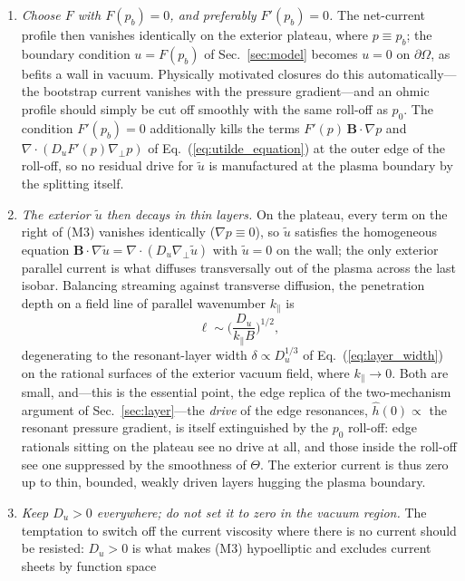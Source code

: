 \documentclass[english]{article}
\newcommand{\bB}{\mathbf{B}}
\newcommand{\gradperp}{\nabla_{\!\perp}}
\begin{document}
\begin{enumerate}
\item \emph{Choose $F$ with $F(p_b)=0$, and preferably $F'(p_b)=0$.} The net-current profile then
vanishes identically on the exterior plateau, where $p\equiv p_b$; the boundary condition
$u=F(p_b)$ of Sec.~\ref{sec:model} becomes $u=0$ on $\partial\Omega$, as befits a wall in vacuum.
Physically motivated closures do this automatically---the bootstrap current vanishes with the
pressure gradient---and an ohmic profile should simply be cut off smoothly with the same roll-off
as $p_0$. The condition $F'(p_b)=0$ additionally kills the terms
$F'(p)\,\bB\cdot\nabla p$ and $\nabla\cdot(D_uF'(p)\gradperp p)$ of
Eq.~(\ref{eq:utilde_equation}) at the outer edge of the roll-off, so no residual drive for
$\tilde u$ is manufactured at the plasma boundary by the splitting itself.
\item \emph{The exterior $\tilde u$ then decays in thin layers.} On the plateau, every term on the
right of (M3) vanishes identically ($\nabla p\equiv0$), so $\tilde u$ satisfies the homogeneous
equation $\bB\cdot\nabla\tilde u=\nabla\cdot(D_u\gradperp\tilde u)$ with $\tilde u=0$ on the wall;
the only exterior parallel current is what diffuses transversally out of the plasma across the
last isobar. Balancing streaming against transverse diffusion, the penetration depth on a field
line of parallel wavenumber $k_\parallel$ is
\begin{equation}
\ell\sim\Big(\frac{D_u}{k_\parallel B}\Big)^{1/2},
\label{eq:u_leakage}
\end{equation}
degenerating to the resonant-layer width $\delta\propto D_u^{1/3}$ of
Eq.~(\ref{eq:layer_width}) on the rational surfaces of the exterior vacuum field, where
$k_\parallel\rightarrow0$. Both are small, and---this is the essential point, the edge replica of
the two-mechanism argument of Sec.~\ref{sec:layer}---the \emph{drive} of the edge resonances,
$\hat h(0)\propto$ the resonant pressure gradient, is itself extinguished by the $p_0$ roll-off:
edge rationals sitting on the plateau see no drive at all, and those inside the roll-off see one
suppressed by the smoothness of $\Theta$. The exterior current is thus zero up to thin, bounded,
weakly driven layers hugging the plasma boundary.
\item \emph{Keep $D_u>0$ everywhere; do not set it to zero in the vacuum region.} The temptation
to switch off the current viscosity where there is no current should be resisted: $D_u>0$ is what
makes (M3) hypoelliptic and excludes current sheets by function space

\end{enumerate}
\end{document}
